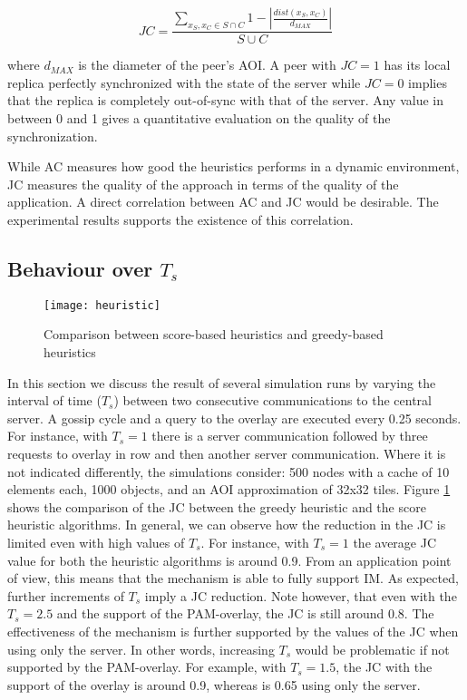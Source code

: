\documentclass[final,10pt,a5paper]{phdimt}
\theoremstyle{definition}
\begin{document}
\begin{equation}
JC = \frac{
\sum_{x_S, x_C \in S \cap C} 1 - |\frac{dist(x_S, x_C)}{d_{MAX}} | }
{S \cup C}
\end{equation}

\noindent
where $d_{MAX}$ is the diameter of the peer's AOI.
A peer with $JC=1$ has its local replica perfectly synchronized with the state of the server while
$JC=0$ implies that the replica is completely out-of-sync with that of the server. Any value in between 0 and 1 gives a quantitative evaluation on the quality of the synchronization.

While AC measures how good the heuristics performs in a dynamic environment, JC measures the quality of the approach in terms of the quality of the application. A direct correlation between AC and JC would be desirable. 
The experimental results supports the existence of this correlation.



\subsection{Behaviour over $T_s$}

\begin{figure}[tbh]
\centering
\texttt{[image: heuristic]}
\caption{Comparison between score-based heuristics and greedy-based heuristics}
\label{graph:heur}
\end{figure}


In this section we discuss the result of several simulation runs by varying the interval of time ($T_s$) between two consecutive communications to the central server. A gossip cycle and a query to the overlay are executed every 0.25 seconds. For instance, with $T_s = 1$ there is a server communication followed by three requests to overlay in row and then another server communication. 
Where it is not indicated differently, the simulations consider: 500 nodes with a cache of 10 elements each, 1000 objects, and an AOI approximation of 32x32 tiles. 
Figure \ref{graph:heur} shows the comparison of the JC between the greedy heuristic and the score heuristic algorithms.
In general, we can observe how the reduction in the JC is limited even with high values of $T_s$.
For instance, with $T_s = 1$ the average JC value for both the heuristic algorithms is around 0.9.
From an application point of view, this means that the mechanism is able to fully support IM.
As expected, further increments of $T_s$ imply a JC reduction. Note however, that even with the $T_s = 2.5$ and the support of the PAM-overlay, the JC is still around 0.8.
The effectiveness of the mechanism is further supported by the values of the JC when using only the server.
In other words, increasing $T_s$ would be problematic if not supported by the PAM-overlay. For example, with $T_s = 1.5$, the JC with the support of the overlay is around 0.9, whereas is 0.65 using only the server.
\end{document}

